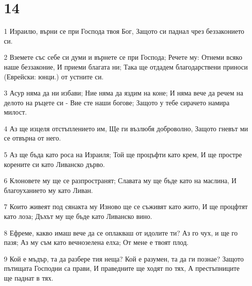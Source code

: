 \chapter{14}

\par 1 Израилю, върни се при Господа твоя Бог, Защото си паднал чрез беззаконието си.
\par 2 Вземете със себе си думи и върнете се при Господа; Речете му: Отнеми всяко наше беззаконие, И приеми благата ни; Така ще отдадем благодарствени приноси (Еврейски: юнци.) от устните си.
\par 3 Асур няма да ни избави; Ние няма да яздим на коне; И няма вече да речем на делото на ръцете си - Вие сте  наши богове; Защото у тебе сирачето намира милост.
\par 4 Аз ще изцеля отстъплението им, Ще ги възлюбя доброволно, Защото гневът ми се отвърна от него.
\par 5 Аз ще бъда като роса на Израиля; Той ще процъфти като крем, И ще простре корените си като Ливанско дърво.
\par 6 Клоновете му ще се разпространят; Славата му ще бъде като на маслина, И благоуханието му като Ливан.
\par 7 Които живеят под сянакта му Изново ще се съживят като жито, И ще процфтят като лоза; Дъхът му ще бъде като Ливанско вино.
\par 8 Ефреме, какво имаш вече да се оплакваш от идолите ти? Аз го чух, и ще го пазя; Аз му съм като вечнозелена елха; От мене е твоят плод.
\par 9 Кой е мъдър, та да разбере тия неща? Кой е разумен, та да ги познае? Защото пътищата Господни са прави, И праведните ще ходят по тях, А престъпниците ще паднат в тях.

